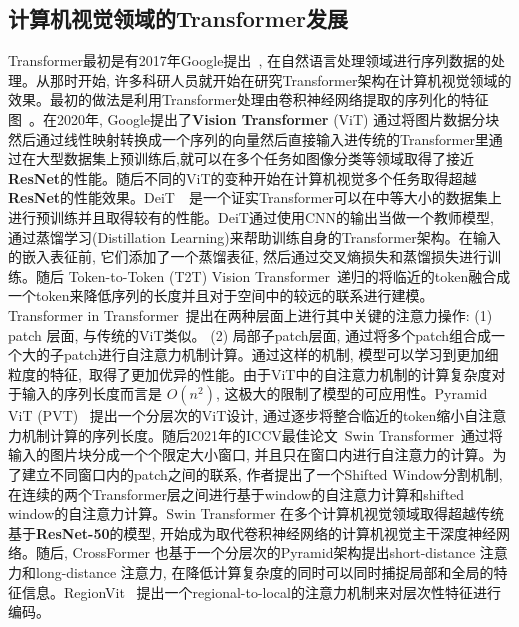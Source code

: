 \subsection{计算机视觉领域的Transformer发展}
Transformer最初是有2017年Google提出~\cite{vaswani2017attention}, 在自然语言处理领域进行序列数据的处理。从那时开始, 许多科研人员就开始在研究Transformer架构在计算机视觉领域的效果。最初的做法是利用Transformer处理由卷积神经网络提取的序列化的特征图~\cite{carion2020end, girdhar2019video, xie2021segmenting}。在2020年, Google提出了\textbf{Vision Transformer} (ViT) 通过将图片数据分块然后通过线性映射转换成一个序列的向量然后直接输入进传统的Transformer里通过在大型数据集上预训练后,就可以在多个任务如图像分类等领域取得了接近\textbf{ResNet}的性能。随后不同的ViT的变种开始在计算机视觉多个任务取得超越\textbf{ResNet}的性能效果。DeiT~\cite{touvron2021training}~是一个证实Transformer可以在中等大小的数据集上进行预训练并且取得较有的性能。DeiT通过使用CNN的输出当做一个教师模型, 通过蒸馏学习(Distillation Learning)来帮助训练自身的Transformer架构。在输入的嵌入表征前, 它们添加了一个蒸馏表征, 然后通过交叉熵损失和蒸馏损失进行训练。随后 Token-to-Token (T2T) Vision Transformer~\cite{yuan2021tokens}递归的将临近的token融合成一个token来降低序列的长度并且对于空间中的较远的联系进行建模。 Transformer in Transformer~\cite{han2021transformer}提出在两种层面上进行其中关键的注意力操作: (1) patch 层面, 与传统的ViT类似。 (2) 局部子patch层面, 通过将多个patch组合成一个大的子patch进行自注意力机制计算。通过这样的机制, 模型可以学习到更加细粒度的特征,~取得了更加优异的性能。由于ViT中的自注意力机制的计算复杂度对于输入的序列长度而言是 $O(n^2)$, 这极大的限制了模型的可应用性。Pyramid ViT (PVT)~\cite{wang2021pyramid} 提出一个分层次的ViT设计, 通过逐步将整合临近的token缩小自注意力机制计算的序列长度。随后2021年的ICCV最佳论文~Swin Transformer~\cite{liu2021swin}通过将输入的图片块分成一个个限定大小窗口, 并且只在窗口内进行自注意力的计算。为了建立不同窗口内的patch之间的联系, 作者提出了一个Shifted Window分割机制, 在连续的两个Transformer层之间进行基于window的自注意力计算和shifted window的自注意力计算。Swin Transformer 在多个计算机视觉领域取得超越传统基于\textbf{ResNet-50}的模型, 开始成为取代卷积神经网络的计算机视觉主干深度神经网络。随后, CrossFormer
也基于一个分层次的Pyramid架构提出short-distance 注意力和long-distance 注意力, 在降低计算复杂度的同时可以同时捕捉局部和全局的特征信息。RegionVit~\cite{chen2021regionvit} 提出一个regional-to-local的注意力机制来对层次性特征进行编码。\par
